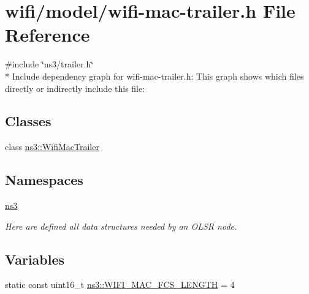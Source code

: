 \hypertarget{wifi-mac-trailer_8h}{}\section{wifi/model/wifi-\/mac-\/trailer.h File Reference}
\label{wifi-mac-trailer_8h}
{\ttfamily \#include \char`\"{}ns3/trailer.\+h\char`\"{}}\\*
Include dependency graph for wifi-\/mac-\/trailer.h\+:
This graph shows which files directly or indirectly include this file\+:
\subsection*{Classes}
\begin{DoxyCompactItemize}
\item 
class \hyperlink{classns3_1_1WifiMacTrailer}{ns3\+::\+Wifi\+Mac\+Trailer}
\end{DoxyCompactItemize}
\subsection*{Namespaces}
\begin{DoxyCompactItemize}
\item 
 \hyperlink{namespacens3}{ns3}
\begin{DoxyCompactList}\small\item\em Here are defined all data structures needed by an O\+L\+SR node. \end{DoxyCompactList}\end{DoxyCompactItemize}
\subsection*{Variables}
\begin{DoxyCompactItemize}
\item 
static const uint16\+\_\+t \hyperlink{namespacens3_a29f18a113e117817e22278a743437c08}{ns3\+::\+W\+I\+F\+I\+\_\+\+M\+A\+C\+\_\+\+F\+C\+S\+\_\+\+L\+E\+N\+G\+TH} = 4
\end{DoxyCompactItemize}
